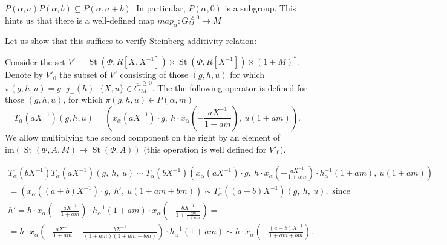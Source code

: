 \documentclass[oneside, 8pt]{amsart}
\theoremstyle{remark}
\theoremstyle{definition}
\DeclareMathOperator{\St}{St}
\numberwithin{equation}{section}
\begin{document}
$P(\alpha, a) P(\alpha, b) \subseteq P(\alpha, a + b)$.
In particular, $P(\alpha, 0)$ is a subgroup.
This hints us that there is a well-defined map $map_\alpha \colon G_M^{\geq 0} \to M$

Let us show that this suffices to verify Steinberg additivity relation:

Consider the set $V' = \St(\Phi, R[X, X^{-1}]) \times \St(\Phi, R[X^{-1}]) \times (1 + M)^*$.
Denote by $V'_0$ the subset of $V'$ consisting of those $(g, h, u)$ for which $\pi(g, h, u) = g \cdot j_-(h) \cdot \{ X, u \} \in \overline{G}_M^{\geq 0}$.
The the following operator is defined for those $(g, h, u)$, for which $\pi(g, h, u) \in P(\alpha, m)$
\[ T_\alpha(aX^{-1})(g, h, u) = \left( x_\alpha(aX^{-1})\cdot g ,\
                                         h \cdot x_\alpha\left(-\frac{aX^{-1}}{1 + am}\right),\ 
                                         u(1 + am)\right).\]
We allow multiplying the second component on the right by an element of $\mathrm{im}(\St(\Phi, A, M) \to \St(\Phi, A))$
 (this operation is well defined for $V'_0$).

\begin{multline}
 T_\alpha(bX^{-1}) T_\alpha(aX^{-1}) \left(g,\ h,\ u\right) \sim
T_\alpha(bX^{-1}) \left(x_\alpha(aX^{-1})\cdot g,\ h \cdot x_\alpha\left(-\frac{aX^{-1}}{1 + am}\right) \cdot h^{-1}_\alpha(1 + am),\ u(1 + am)\right) = \\
 = \left( x_\alpha\left((a+b)X^{-1}\right)\cdot g,\ h',\ u(1 + am + bm) \right) \sim T_\alpha((a+b)X^{-1}) \left( g,\ h,\ u\right),\text{ since} \end{multline} 
 \begin{multline}
h' = h \cdot x_\alpha\left(-\frac{aX^{-1}}{1+am}\right) \cdot h^{-1}_\alpha(1+am) \cdot x_\alpha\left(-\frac{bX^{-1}}{1 + \frac{bm}{1+am}}\right) = \\ = 
 h \cdot x_\alpha\left(- \frac{aX^{-1}}{1 + am} - \frac{bX^{-1}}{(1+am)(1 + am + bm)}\right) \cdot h^{-1}_\alpha(1+am) \sim  
  h \cdot x_\alpha\left(- \frac{(a+b)X^{-1}}{1 + am + bm}\right).
\end{multline}
\end{document}
